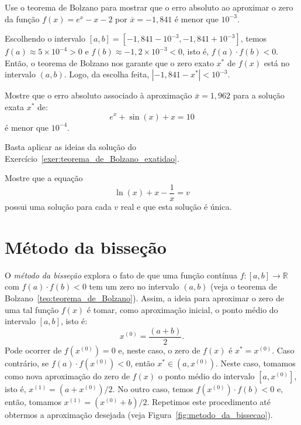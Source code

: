 \begin{exer}\label{exer:teorema_de_Bolzano_exatidao} Use o teorema de Bolzano para mostrar que o erro absoluto ao aproximar o zero da função $f(x)=e^x-x-2$ por $\overline{x}=-1,841$ é menor que $10^{-3}$.
\end{exer}
\begin{resp}

    Escolhendo o intervalo $[a, b] = [-1,841-10^{-3}, -1,841+10^{-3}]$, temos $f(a)\approx 5\times 10^{-4} > 0$ e $f(b)\approx -1,2\times 10^{-3} < 0$, isto é, $f(a)\cdot f(b) < 0$. Então, o teorema de Bolzano nos garante que o zero exato $x^*$ de $f(x)$ está no intervalo $(a, b)$. Logo, da escolha feita, $|-1,841 - x^*| < 10^{-3}$.

\end{resp}

\begin{exer} Mostre que o erro absoluto associado à aproximação $\overline{x} = 1,962$ para a solução exata $x^*$ de:
  \begin{equation}
    e^x+\sin (x) +x = 10
  \end{equation}
é menor que $10^{-4}$.
\end{exer}
\begin{resp}
  Basta aplicar as ideias da solução do Exercício~\ref{exer:teorema_de_Bolzano_exatidao}.
\end{resp}

\begin{exer}\label{existe_unica} Mostre que a equação
  \begin{equation}
    \ln(x)+x-\frac{1}{x}=v
  \end{equation}
possui uma solução para cada $v$ real e que esta solução é única.
\end{exer}

\section{Método da bisseção}

O \emph{método da bisseção} explora o fato de que uma função contínua $f:[a, b]\to \mathbb{R}$ com $f(a)\cdot f(b) < 0$ tem um zero no intervalo $(a, b)$ (veja o teorema de Bolzano~\ref{teo:teorema_de_Bolzano}). Assim, a ideia para aproximar o zero de uma tal função $f(x)$ é tomar, como aproximação inicial, o ponto médio do intervalo $[a, b]$, isto é:
\begin{equation}
  x^{(0)} = \frac{(a + b)}{2}.
\end{equation}
Pode ocorrer de $f(x^{(0)}) = 0$ e, neste caso, o zero de $f(x)$ é $x^* = x^{(0)}$. Caso contrário, se $f(a)\cdot f(x^{(0)}) < 0$, então $x^*\in (a, x^{(0)})$. Neste caso, tomamos como nova aproximação do zero de $f(x)$ o ponto médio do intervalo $[a, x^{(0)}]$, isto é, $x^{(1)} = (a + x^{(0)})/2$. No outro caso, temos $f(x^{(0)})\cdot f(b) < 0$ e, então, tomamos $x^{(1)} = (x^{(0)} + b)/2$. Repetimos este procedimento até obtermos a aproximação desejada (veja Figura~\ref{fig:metodo_da_bissecao}).

